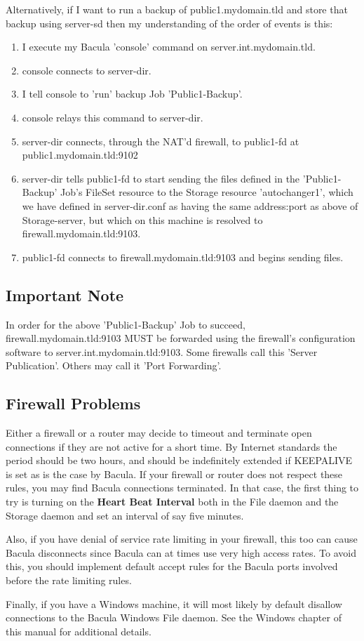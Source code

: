 Alternatively, if I want to run a backup of public1.mydomain.tld and store
that backup using server-sd then my understanding of the order of events is
this: 

\begin{enumerate}
\item I execute my Bacula 'console' command on server.int.mydomain.tld.  
\item console connects to server-dir.  
\item I tell console to 'run' backup Job 'Public1-Backup'.  
\item console relays this command to server-dir.  
\item server-dir connects, through the NAT'd firewall, to public1-fd at 
   public1.mydomain.tld:9102  
\item server-dir tells public1-fd to start sending the files defined in  the
   'Public1-Backup' Job's FileSet resource to the Storage resource 
   'autochanger1', which we have defined in server-dir.conf as having the 
   same address:port as above of Storage-server, but which on this machine
   is resolved to firewall.mydomain.tld:9103.  
\item public1-fd connects to firewall.mydomain.tld:9103 and begins sending 
   files. 
   \end{enumerate}

\subsection{Important Note}

In order for the above 'Public1-Backup' Job to succeed,
firewall.mydomain.tld:9103 MUST be forwarded using the firewall's
configuration software to server.int.mydomain.tld:9103. Some firewalls call
this 'Server Publication'. Others may call it 'Port Forwarding'. 

\subsection{Firewall Problems}
Either a firewall or a router may decide to timeout and terminate
open connections if they are not active for a short time. By Internet
standards the period should be two hours, and should be indefinitely
extended if KEEPALIVE is set as is the case by Bacula.  If your firewall
or router does not respect these rules, you may find Bacula connections
terminated. In that case, the first thing to try is turning on the
{\bf Heart Beat Interval} both in the File daemon and the Storage daemon
and set an interval of say five minutes.

Also, if you have denial of service rate limiting in your firewall, this
too can cause Bacula disconnects since Bacula can at times use very high 
access rates. To avoid this, you should implement default accept
rules for the Bacula ports involved before the rate limiting rules.

Finally, if you have a Windows machine, it will most likely by default
disallow connections to the Bacula Windows File daemon.  See the      
Windows chapter of this manual for additional details.
